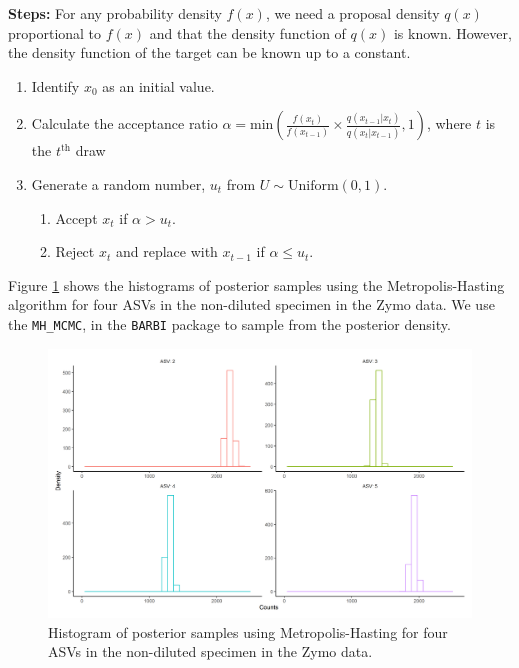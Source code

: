 \documentclass[12pt]{article}
\begin{document}
\textbf{Steps:} For any probability density $f(x)$, we need a proposal density $q(x)$ proportional to $f(x)$ and that the density function of $q(x)$ is known. However, the density function of the target can be known up to a constant. 

\begin{enumerate}
	\item Identify $x_0$ as an initial value.
	\item {Calculate the acceptance ratio $\alpha= \text{min}\left(\frac{f(x_{t})}{f(x_{t-1})}\times\frac{q(x_{t-1}|x_{t})}{q(x_{t}|x_{t-1})}, 1\right)$, where $t$ is the $t^{\text{th}}$ draw}
	\item {Generate a random number, $u_t$ from $U \sim \text{Uniform}(0,1)$}.
	\begin{enumerate}
		\item {Accept $x_t$ if $\alpha > u_t$}.
		\item {Reject $x_t$ and replace with $x_{t-1}$ if $\alpha \leq u_t$}.
	\end{enumerate}
\end{enumerate}


Figure \ref{fig:mh} shows the histograms of posterior samples using the Metropolis-Hasting algorithm for four ASVs in the non-diluted specimen in the Zymo data.
We use the \texttt{MH\_MCMC}, in the \texttt{BARBI} package to sample from the posterior density.

\begin{figure}[H]
	\centering
	\includegraphics[width=\textwidth]{metropolis_hasting.png}
	\caption{Histogram of posterior samples using Metropolis-Hasting for four ASVs in the non-diluted specimen in the Zymo data.}
	\label{fig:mh}     
\end{figure}
\end{document}
